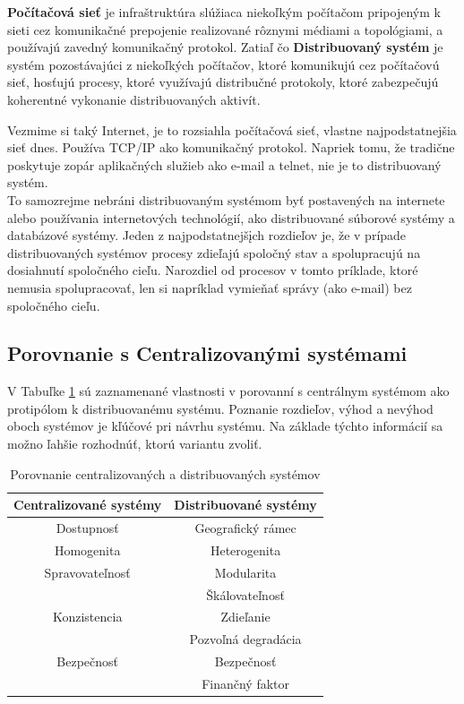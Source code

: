 \textbf{Počítačová sieť} je infraštruktúra slúžiaca niekoľkým počítačom  pripojeným k sieti cez komunikačné prepojenie realizované rôznymi médiami a topológiami, a používajú zavedný komunikačný protokol.
Zatiaľ čo \textbf{Distribuovaný systém} je systém pozostávajúci z niekoľkých počítačov, ktoré komunikujú cez počítačovú sieť, hosťujú procesy, ktoré využívajú distribučné protokoly, ktoré zabezpečujú koherentné vykonanie distribuovaných aktivít. \\

\begin{exmpl}
	Vezmime si taký Internet, je to rozsiahla počítačová sieť, vlastne najpodstatnejšia sieť dnes. Používa TCP/IP ako komunikačný protokol.
	Napriek tomu, že tradične poskytuje zopár aplikačných služieb ako e-mail a telnet, nie je to distribuovaný systém. \\
	
	To samozrejme nebráni distribuovaným systémom byť postavených na internete alebo používania internetových technológií, ako distribuované súborové systémy a databázové systémy.
	Jeden z najpodstatnejšįch rozdieľov je, že v prípade distribuovaných systémov procesy zdieľajú spoločný stav a spolupracujú na dosiahnutí spoločného cieľu. Narozdiel od procesov v tomto príklade, ktoré nemusia spolupracovať, len si napríklad vymieňať správy (ako e-mail) bez spoločného cieľu.
\end{exmpl}

\subsection{Porovnanie s Centralizovanými systémami}

V Tabuľke \ref{Tab:central_vs_distr} sú zaznamenané vlastnosti v porovanní s centrálnym systémom ako protipólom k distribuovanému systému. Poznanie rozdieľov, výhod a nevýhod oboch systémov je kľúčové pri návrhu systému. Na základe týchto informácií sa možno ľahšie rozhodnúť, ktorú variantu zvoliť.

\begin{table} [ht]
\begin{center}
	\begin{tabular}{| c | c |} 
		\hline
		Centralizované systémy & Distribuované systémy \\ [0.5ex] 
		\hline\hline
		Dostupnosť & Geografický rámec \\ 
		Homogenita & Heterogenita \\
		Spravovateľnosť & Modularita \\
		 & Škálovateľnosť \\
		 Konzistencia & Zdieľanie \\
		 & Pozvoľná degradácia \\
		 Bezpečnosť & Bezpečnosť \\
		 & Finančný faktor \\ [1ex] 
		\hline
	\end{tabular}
\end{center}
\caption{Porovnanie centralizovaných a distribuovaných systémov}
\label{Tab:central_vs_distr}
\end{table}

